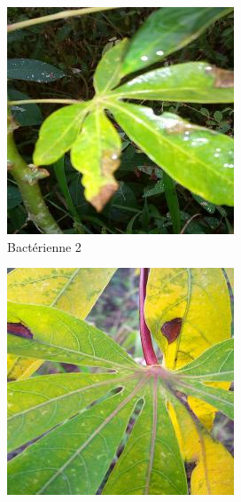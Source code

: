 \documentclass{article}
\begin{document}
\begin{itemize}
\begin{figure}[htbp]
\begin{subfigure}[b]{0.3\textwidth}
					\includegraphics[width=\textwidth]{img/2.jpg}
					\caption{Bactérienne 2}
				\end{subfigure}
				\hfill
				\begin{subfigure}[b]{0.3\textwidth}
					\centering
					\includegraphics[width=\textwidth]{img/3.jpg}

\end{subfigure}
\end{figure}
\end{itemize}
\end{document}
